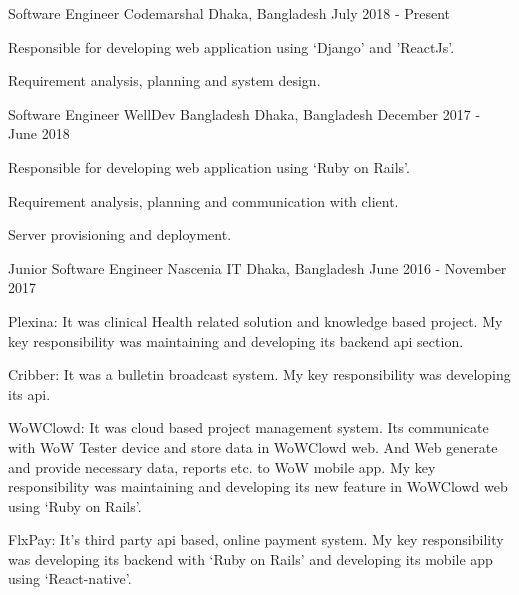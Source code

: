 \begin{cventries}

\cventry
    {Software Engineer}
    {Codemarshal}
    {Dhaka, Bangladesh}
    {July 2018 - Present}
    {
      \begin{cvitems}[Responsibilities:]
        \item {Responsible for developing web application using ‘Django’ and 'ReactJs'.}
        \vspace{1mm}
        \item {Requirement analysis, planning and system design.}
      \end{cvitems}
    }

\cventry
    {Software Engineer}
    {WellDev Bangladesh}
    {Dhaka, Bangladesh}
    {December 2017 - June 2018}
    {
      \begin{cvitems}[Responsibilities:]
        \item {Responsible for developing web application using ‘Ruby on Rails’.}
        \vspace{1mm}
        \item {Requirement analysis, planning and communication with client.}
        \vspace{1mm}
        \item {Server provisioning and deployment.}
      \end{cvitems}
    }

\cventry
    {Junior Software Engineer}
    {Nascenia IT}
    {Dhaka, Bangladesh}
    {June 2016 - November 2017}
    {
      \begin{cvitems}[Projects:]
        \vspace{1mm}
        \item {Plexina:  It was clinical Health related solution and knowledge based project. My key responsibility was maintaining and developing its backend api section.}
        \vspace{1mm}
        \item {Cribber: It was a bulletin broadcast system. My key responsibility was developing its api.}
        \vspace{1mm}
        \item {WoWClowd: It was cloud based project management system. Its communicate with WoW Tester device and store data in WoWClowd web. And Web generate and provide necessary data, reports etc. to WoW mobile app. My key responsibility was maintaining and developing its new feature in WoWClowd web using  ‘Ruby on Rails’.
        \vspace{1mm}
}
        \item {FlxPay:  It’s third party api based, online payment system. My key responsibility was developing its backend with ‘Ruby on Rails’ and developing its mobile app using ‘React-native’.}
      \end{cvitems}
    }
\end{cventries}
